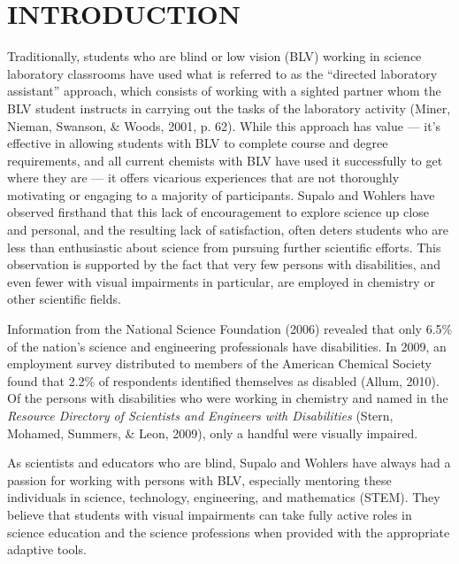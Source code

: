 \documentclass[11.5pt]{sig-alternate} %
\begin{document}
\pagebreak
\clearpage

\section*{INTRODUCTION}
\begin{large}
Traditionally, students who are blind or low vision (BLV) working in science laboratory classrooms have used what is referred to as the “directed laboratory assistant” approach, which consists of working with a sighted partner whom the BLV student instructs in carrying out the tasks of the laboratory activity (Miner, Nieman, Swanson, \& Woods, 2001, p. 62). While this approach has value — it’s effective in allowing students with BLV to complete course and degree requirements, and all current chemists with BLV have used it successfully to get where they are — it offers vicarious experiences that are not thoroughly motivating or engaging to a majority of participants. Supalo and Wohlers have observed firsthand that this lack of encouragement to explore science up close and personal, and the resulting lack of satisfaction, often deters students who are less than enthusiastic about science from pursuing further scientific efforts. This observation is supported by the fact that very few persons with disabilities, and even fewer with visual impairments in particular, are employed in chemistry or other scientific fields.

Information from the National Science Foundation (2006) revealed that only 6.5\% of the nation’s science and engineering professionals have disabilities. In 2009, an employment survey distributed to members of the American Chemical Society found that 2.2\% of respondents identified themselves as disabled (Allum, 2010). Of the persons with disabilities who were working in chemistry and named in the \textit{Resource Directory of Scientists and Engineers with Disabilities} (Stern, Mohamed, Summers, \& Leon, 2009), only a handful were visually impaired.

As scientists and educators who are blind, Supalo and Wohlers have always had a passion for working with persons with BLV, especially mentoring these individuals in science, technology, engineering, and mathematics (STEM). They believe that students with visual impairments can take fully active roles in science education and the science professions when provided with the appropriate adaptive tools.


\end{large}
\end{document}
